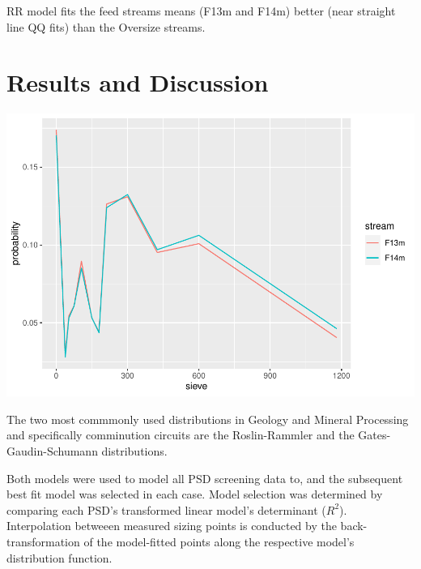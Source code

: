 \documentclass[
]{article}
\begin{document}
RR model fits the feed streams means (F13m and F14m) better (near
straight line QQ fits) than the Oversize streams.

\hypertarget{results-and-discussion}{%
\section{Results and Discussion}\label{results-and-discussion}}

\includegraphics{base_files/figure-latex/unnamed-chunk-11-1.pdf}

The two most commmonly used distributions in Geology and Mineral
Processing and specifically comminution circuits are the Roslin-Rammler
and the Gates-Gaudin-Schumann distributions.

Both models were used to model all PSD screening data to, and the
subsequent best fit model was selected in each case. Model selection was
determined by comparing each PSD's transformed linear model's
determinant (\(R^2\)). Interpolation betweeen measured sizing points is
conducted by the back-transformation of the model-fitted points along
the respective model's distribution function.
\end{document}

